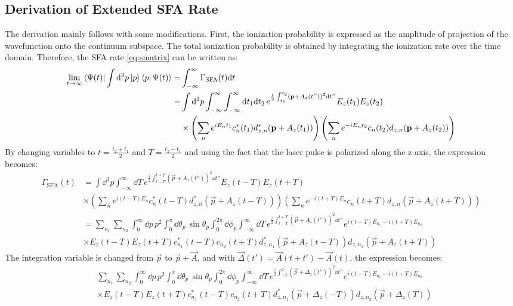 \subsection{Derivation of Extended SFA Rate}
The derivation mainly follows \cite{Theory_NPS} with some modifications.
First, the ionization probability is expressed as the amplitude of projection of the wavefunction onto the continuum subspace.
The total ionization probability is obtained by integrating the ionization rate over the time domain.
Therefore, the SFA rate \eqref{eq:smatrix} can be written as:
\begin{align*}
    \lim_{t\to\infty}\braket{\Psi(t)|\int \dd^3 p \ket{p}\bra{p}\Psi(t)} = &\int_{-\infty}^{\infty} \Gamma_{\mathrm{SFA}}(t) \dd t \\ %
    = &\int \dd^3 p \int_{-\infty}^{\infty} \int_{-\infty}^{\infty} \dd t_1  \dd t_2 \, e^{\frac{i}{2}\int_{t_1}^{t_2}(\vec{p}+A_z(t''))^2\dd t''} E_z(t_1)E_z(t_2)\\
    &\times\left(\sum_{n}e^{iE_nt_1}c_n^*(t_1)d_{z,n}^*(\vec{p}+A_z(t_1))\right)\left(\sum_{n}e^{-iE_nt_2}c_n(t_2)d_{z,n}(\vec{p}+A_z(t_2))\right)
\end{align*}
By changing variables to $t=\frac{t_2+t_1}{2}$ and $T=\frac{t_2-t_1}{2}$ and using the fact that the laser pulse is polarized along the z-axis, the expression becomes:
\begin{align*}
    \Gamma_{\mathrm{SFA}}(t) &= \int \dd^3 p \int_{-\infty}^{\infty} \dd T \, e^{\frac{i}{2}\int_{t-T}^{t+T}(\vec{p}+A_z(t''))^2\dd t''} E_z(t-T) E_z(t+T)\\
    &\times\left(\sum_{n}e^{i(t-T)E_n}c_n^*(t-T)d_{z,n}^*(\vec{p}+A_z(t-T))\right)\left(\sum_{n}e^{-i(t+T)E_n}c_n(t+T)d_{z,n}(\vec{p}+A_z(t+T))\right)\\
    &= \sum_{n_1}\sum_{n_2} \int_0^{\infty} \dd p\,p^2\int_0^{\pi} \dd\theta_p\,\sin\theta_p \int_0^{2\pi}\dd \phi_p\int_{-\infty}^{\infty} \dd T \, e^{\frac{i}{2}\int_{t-T}^{t+T}(\vec{p}+A_z(t''))^2\dd t''} e^{i(t-T)E_{n_1}-i(t+T)E_{n_2}}\\
    &\times E_z(t-T) E_z(t+T)c_{n_1}^*(t-T)c_{n_2}(t+T) d_{z,n_1}^*(\vec{p}+A_z(t-T))d_{z,n_2}(\vec{p}+A_z(t+T))
\end{align*}
The integration variable is changed from $\vec{p}$ to $\vec{p}+\vec{A}$, and with $\vec{\Delta}(t') = \vec{A}(t+t') - \vec{A}(t)$, the expression becomes:
\begin{align*}
    &\sum_{n_1}\sum_{n_2} \int_0^{\infty} \dd p\,p^2\int_0^{\pi} \dd\theta_p\,\sin\theta_p \int_0^{2\pi}\dd \phi_p\int_{-\infty}^{\infty} \dd T \, e^{\frac{i}{2}\int_{-T}^{T}(\vec{p}+\Delta_z(t''))^2\dd t''} e^{i(t-T)E_{n_1}-i(t+T)E_{n_2}}\\
    &\times E_z(t-T) E_z(t+T)c_{n_1}^*(t-T)c_{n_2}(t+T) d_{z,n_1}^*(\vec{p}+\Delta_z(-T))d_{z,n_2}(\vec{p}+\Delta_z(T))
\end{align*} 
